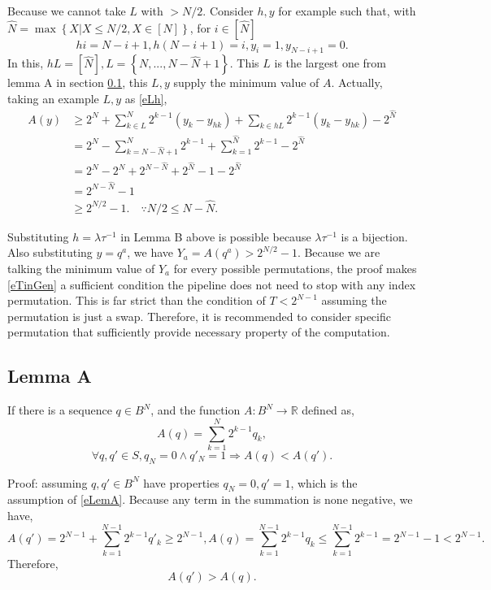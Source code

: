 \documentclass[a4paper]{article}
\newcommand{\eqlabel}[1]{\label{#1}}
\newcommand{\cbr}[1]{\left\{#1\right\}}
\newcommand{\sR}{\mathbb{R}}
\begin{document}
Because we cannot take \(L\) with \(> N/2\). Consider \(h, y\) for example such that, with \(\hat{N} = \max \cbr{X| X \leq N/2, X\in [N]}\), for \(i \in[\hat{N}]\)
\begin{equation}
    \eqlabel{eLh}
    hi = N-i+1,  h (N-i+1) =i, y_i = 1, y_{N-i+1} = 0.
\end{equation}
In this, \(hL = [\hat{N}], L = \cbr{N,...,N-\hat{N}+1}\). This \(L\) is the largest one from lemma A in section \ref{slemmaA}, this \(L, y\) supply the minimum value of \(A\). Actually, taking an example \(L, y\) as \eqref{eLh}, 
\begin{align*}
A(y) &\geq 2^N + \sum_{k\in L}^N 2^{k-1} (y_k - y_{hk})  + \sum_{k\in hL}2^{k-1}(y_k - y_{hk}) - 2^{\hat{N}} \\
&= 2^N - \sum_{k=N-\hat{N}+1}^{N} 2^{k-1}  + \sum_{k=1}^{\hat{N}} 2^{k-1} - 2^{\hat{N}}\\
&= 2^N - 2^{N} + 2^{N-\hat{N}} + 2^{\hat{N}} - 1 - 2^{\hat{N}}\\
&= 2^{N-\hat{N}}  - 1\\
&\geq 2^{N/2}  - 1. \quad\because N/2 \leq N- \hat{N}.
\end{align*}

Substituting \(h = \lambda\tau^{-1}\) in Lemma B above is possible because \(\lambda\tau^{-1}\) is a bijection. Also substituting \(y = q^a\), we have \(Y_a = A(q^a) > 2^{N/2}-1\). Because we are talking the minimum value of \(Y_a\) for every possible permutations, the proof makes \eqref{eTinGen} a sufficient condition the pipeline does not need to stop with any index permutation. This is far strict than the condition of \(T < 2^{N-1}\) assuming the permutation is just a swap. Therefore, it is recommended to consider specific permutation that sufficiently provide necessary property of the computation.
\subsection{Lemma A}
\label{slemmaA}

If there is a sequence \(q\in B^N\), and the function \(A: B^N \to \sR\) defined as,
\[
    A(q) = \sum_{k=1}^N 2^{k-1}q_k,
\]
\begin{equation}
    \eqlabel{eLemA}
\forall q, q'\in S, q_N=0\land q'_N=1\Rightarrow A(q) < A(q').
\end{equation}

Proof: assuming \(q, q'\in B^N\) have properties \(q_N=0, q'=1\), which is the assumption of \eqref{eLemA}. Because any term in the summation is none negative, we have,
\[
 A(q') = 2^{N-1} + \sum_{k=1}^{N-1} 2^{k-1}q'_k \geq 2^{N-1}, A(q) = \sum_{k=1}^{N-1} 2^{k-1} q_k \leq  \sum_{k=1}^{N-1} 2^{k-1} =  2^{N-1} - 1 < 2^{N-1}.
\]
Therefore,
\[
A(q') > A(q).
\]
\end{document}
